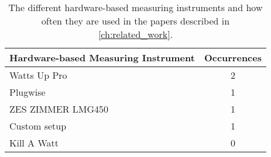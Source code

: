 \begin{table}[ht]
    \centering
    \begin{tabular}{| l | c |}
    \hline
    \textbf{Hardware-based Measuring Instrument}  & \textbf{Occurrences}                    \\ \hline
    Watts Up Pro        & 2      \\ \hline
    Plugwise            & 1      \\ \hline
    ZES ZIMMER LMG450   & 1      \\ \hline
    Custom setup        & 1      \\ \hline
    Kill A Watt         & 0      \\ \hline
    \end{tabular}
    \caption{The different hardware-based measuring instruments and how often they are used in the papers described in \cref{ch:related_work}.}
    \label{tab:Hardware_based_Measuring_instruments}
    \end{table}